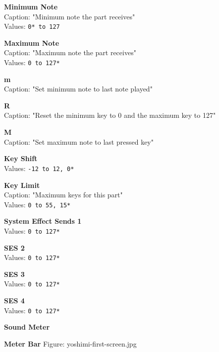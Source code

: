 \documentclass[
 11pt,
 twoside,
 a4paper,
 headinclude,
 footinclude,
 final                                 %
]{article}
\begin{document}
\begin{enumber}
\begin{enumber}
\begin{enumber}
      \end{enumber}
      \item \textbf{Minimum Note} \\
         Caption: "Minimum note the part receives" \\
         Values: \texttt{0* to 127}
      \item \textbf{Maximum Note} \\
         Caption: "Maximum note the part receives" \\
         Values: \texttt{0 to 127*}
      \item \textbf{m} \\
         Caption: "Set minimum note to last note played"
      \item \textbf{R} \\
         Caption: "Reset the minimum key to 0 and the maximum key to 127"
      \item \textbf{M} \\
         Caption: "Set maximum note to last pressed key"
      \item \textbf{Key Shift} \\
         Values: \texttt{-12 to 12, 0*}
      \item \textbf{Key Limit} \\
         Caption: "Maximum keys for this part" \\
         Values: \texttt{0 to 55, 15*}
      \item \textbf{System Effect Sends 1} \\
         Values: \texttt{0 to 127*}
      \item \textbf{SES 2} \\
         Values: \texttt{0 to 127*}
      \item \textbf{SES 3} \\
         Values: \texttt{0 to 127*}
      \item \textbf{SES 4} \\
         Values: \texttt{0 to 127*}
   \end{enumber}
   \item \textbf{Sound Meter}
   \begin{enumber}
      \item \textbf{Meter Bar}
         Figure: yoshimi-first-screen.jpg
   \end{enumber}



\end{enumber}
\end{document}
